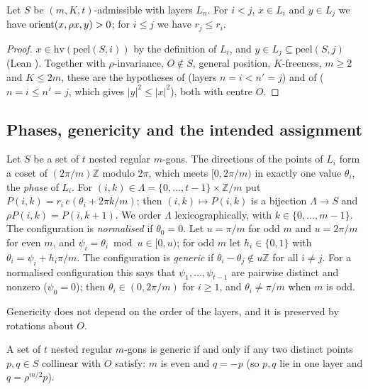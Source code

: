 \begin{lemma}\label{k8s:lem:nest}
Let $S$ be $(m,K,t)$-admissible with layers $L_n$. For $i<j$, $x\in L_i$ and $y\in L_j$ we have $\operatorname{orient}(x,\rho x,y)>0$;
for $i\le j$ we have $r_j\le r_i$.
\end{lemma}

\begin{proof}
$x\in\mathrm{hv}(\mathrm{peel}(S,i))$ by the definition of $L_i$, and $y\in L_j\subseteq\mathrm{peel}(S,j)$ (Lean
). Together with $\rho$-invariance, $O\notin S$, general position, $K$-freeness, $m\ge2$ and
$K\le2m$, these are the hypotheses of  (layers $n=i<n'=j$) and of 
($n=i\le n'=j$, which gives $|y|^2\le|x|^2$), both with centre $O$.
\end{proof}

\subsection{Phases, genericity and the intended assignment}\label{k8s:sec:phases}

\begin{definition}\label{k8s:def:phase}
Let $S$ be a set of $t$ nested regular $m$-gons. The directions of the points of $L_i$ form a coset of
$(2\pi/m)\mathbb Z$ modulo $2\pi$, which meets $[0,2\pi/m)$ in exactly one value $\theta_i$, the \emph{phase} of $L_i$.
For $(i,k)\in\Lambda=\{0,\dots,t-1\}\times\mathbb Z/m$ put $P(i,k)=r_i\,e(\theta_i+2\pi k/m)$; then $(i,k)\mapsto P(i,k)$
is a bijection $\Lambda\to S$ and $\rho P(i,k)=P(i,k+1)$. We order $\Lambda$ lexicographically, with
$k\in\{0,\dots,m-1\}$. The configuration is \emph{normalised} if $\theta_0=0$. Let $u=\pi/m$ for odd $m$ and $u=2\pi/m$
for even $m$, and $\psi_i=\theta_i\bmod u\in[0,u)$; for odd $m$ let $h_i\in\{0,1\}$ with $\theta_i=\psi_i+h_i\pi/m$. The
configuration is \emph{generic} if $\theta_i-\theta_j\notin u\mathbb Z$ for all $i\ne j$. For a normalised configuration
this says that $\psi_1,\dots,\psi_{t-1}$ are pairwise distinct and nonzero ($\psi_0=0$); then $\theta_i\in(0,2\pi/m)$ for
$i\ge1$, and $\theta_i\ne\pi/m$ when $m$ is odd.
\end{definition}

Genericity does not depend on the order of the layers, and it is preserved by rotations about $O$.

\begin{lemma}\label{k8s:lem:collinear}
A set of $t$ nested regular $m$-gons is generic if and only if any two distinct points $p,q\in S$ collinear with $O$
satisfy: $m$ is even and $q=-p$ (so $p,q$ lie in one layer and $q=\rho^{m/2}p$).
\end{lemma}

